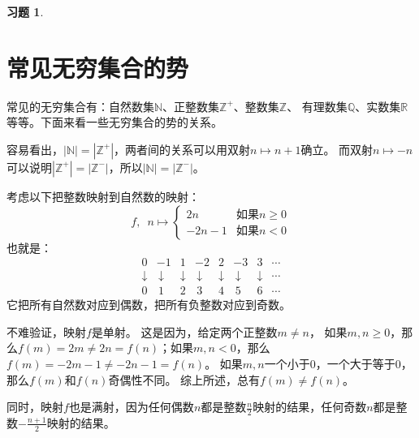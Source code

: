 \documentclass[12pt,UTF8]{ctexbook}
\theoremstyle{definition}
\theoremstyle{plain}
\newtheorem{xt}{习题}[section]
\begin{document}
\begin{xt}
    
    
\end{xt}

\section{常见无穷集合的势}

常见的无穷集合有：自然数集$\mathbb{N}$、正整数集$\mathbb{Z}^+$、整数集$\mathbb{Z}$、
有理数集$\mathbb{Q}$、实数集$\mathbb{R}$等等。下面来看一些无穷集合的势的关系。

容易看出，$|\mathbb{N}| = |\mathbb{Z}^+|$，两者间的关系可以用双射$n\mapsto n + 1$确立。
而双射$n \mapsto -n$可以说明$|\mathbb{Z}^+| = |\mathbb{Z}^-|$，所以$|\mathbb{N}| = |\mathbb{Z}^-|$。

考虑以下把整数映射到自然数的映射：
$$ f,\,\,\,n\mapsto \left\{
    \begin{array}{cl}
        2n & \mbox{如果}n \geqslant 0 \\
        -2n - 1  & \mbox{如果}n < 0 
    \end{array}\right.
$$
也就是：
$$ \begin{array}{cccccccc}
        0 & -1 & 1 & -2 & 2 & -3 & 3 & \cdots \\
        \downarrow & \,\downarrow & \downarrow & \,\downarrow & \downarrow & \,\downarrow & \downarrow & \cdots \\
        0 & \,1 & 2 & \,3 & 4 & \,5 & 6 & \cdots 
    \end{array}
$$
它把所有自然数对应到偶数，把所有负整数对应到奇数。

不难验证，映射$f$是单射。
这是因为，给定两个正整数$m \neq n$，
如果$m,n\geqslant 0$，那么$f(m) = 2m \neq 2n = f(n)$；如果$m,n< 0$，那么$f(m) = -2m - 1 \neq -2n - 1 = f(n)$。
如果$m,n$一个小于$0$，一个大于等于$0$，那么$f(m)$和$f(n)$奇偶性不同。
综上所述，总有$f(m) \neq f(n)$。

同时，映射$f$也是满射，因为任何偶数$n$都是整数$\frac{n}{2}$映射的结果，任何奇数$n$都是整数$-\frac{n+1}{2}$映射的结果。
\end{document}
